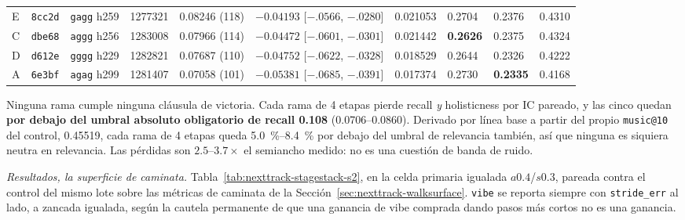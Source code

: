 \documentclass[11pt]{article}
\newcommand{\best}[1]{\textbf{#1}}
\begin{document}
\begin{table}[ht]
{\begin{tabular}{lllrllllll}
    E & \texttt{8cc2d} & \texttt{gagg} h259 & \num{1277321} & 0.08246 (118) & $-0.04193$ [$-.0566$, $-.0280$] & 0.021053 & 0.2704 & 0.2376 & 0.4310 \\
    C & \texttt{dbe68} & \texttt{aggg} h256 & \num{1283008} & 0.07966 (114) & $-0.04472$ [$-.0601$, $-.0301$] & 0.021442 & \best{0.2626} & 0.2375 & 0.4324 \\
    D & \texttt{d612e} & \texttt{gggg} h229 & \num{1282821} & 0.07687 (110) & $-0.04752$ [$-.0622$, $-.0328$] & 0.018529 & 0.2644 & 0.2326 & 0.4222 \\
    A & \texttt{6e3bf} & \texttt{agag} h299 & \num{1281407} & 0.07058 (101) & $-0.05381$ [$-.0685$, $-.0391$] & 0.017374 & 0.2730 & \best{0.2335} & 0.4168 \\
    \bottomrule
  \end{tabular}}
\end{table}

Ninguna rama cumple ninguna cláusula de victoria. Cada rama de 4 etapas pierde
recall \emph{y} holisticness por IC pareado, y las cinco quedan \textbf{por debajo
del umbral absoluto obligatorio de recall \num{0.108}}
(\numrange{0.0706}{0.0860}). Derivado por línea base a partir del propio
\texttt{music@10} del control, \num{0.45519}, cada rama de 4 etapas queda
\SIrange{5.0}{8.4}{\percent} por debajo del umbral de relevancia también, así que
ninguna es siquiera neutra en relevancia. Las pérdidas son
$\numrange{2.5}{3.7}\times$ el semiancho medido: no es una cuestión de banda de
ruido.

\emph{Resultados, la superficie de caminata.} Tabla~\ref{tab:nexttrack-stagestack-s2}, en la
celda primaria igualada $a\num{0.4}$/$s\num{0.3}$, pareada contra el control del
mismo lote sobre las métricas de caminata de la Sección~\ref{sec:nexttrack-walksurface}. \texttt{vibe} se
reporta siempre con \texttt{stride\_err} al lado, a zancada igualada, según la
cautela permanente de que una ganancia de vibe comprada dando pasos más cortos no es
una ganancia.
\end{document}
